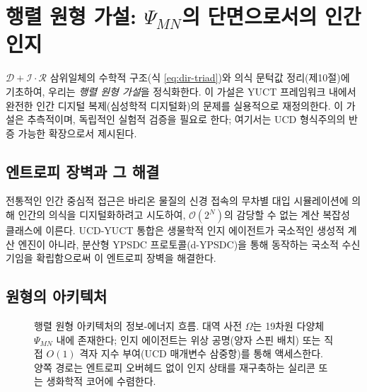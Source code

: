\documentclass[11pt,a4paper]{article}
\begin{document}
	\section{행렬 원형 가설: \(\Psi_{MN}\)의 단면으로서의 인간 인지}
	\label{sec:matrix}
	
	\(\mathcal{D}+\mathcal{I}\cdot\mathcal{R}\) 삼위일체의 수학적 구조(식 \ref{eq:dir-triad})와 의식 문턱값 정리(제10절)에 기초하여, 우리는 \textit{행렬 원형 가설}을 정식화한다. 이 가설은 YUCT 프레임워크 내에서 완전한 인간 디지털 복제(심성학적 디지털화)의 문제를 실용적으로 재정의한다. 이 가설은 추측적이며, 독립적인 실험적 검증을 필요로 한다; 여기서는 UCD 형식주의의 반증 가능한 확장으로서 제시된다.
	
	\subsection{엔트로피 장벽과 그 해결}
	
	전통적인 인간 중심적 접근은 바리온 물질의 신경 접속의 무차별 대입 시뮬레이션에 의해 인간의 의식을 디지털화하려고 시도하여, \(\mathcal{O}(2^N)\)의 감당할 수 없는 계산 복잡성 클래스에 이른다. UCD-YUCT 통합은 생물학적 인지 에이전트가 국소적인 생성적 계산 엔진이 아니라, 분산형 YPSDC 프로토콜(d-YPSDC)을 통해 동작하는 국소적 수신기임을 확립함으로써 이 엔트로피 장벽을 해결한다.
	
	\subsection{원형의 아키텍처}
	
	\begin{figure}[h!]
		\centering
		\caption{행렬 원형 아키텍처의 정보-에너지 흐름. 대역 사전 \(\Omega\)는 19차원 다양체 \(\Psi_{MN}\) 내에 존재한다; 인지 에이전트는 위상 공명(양자 스핀 배치) 또는 직접 \(O(1)\) 격자 지수 부여(UCD 매개변수 삼중항)를 통해 액세스한다. 양쪽 경로는 엔트로피 오버헤드 없이 인지 상태를 재구축하는 실리콘 또는 생화학적 코어에 수렴한다.}
		\label{fig:matrix_flow}
	\end{figure}
	
\end{document}

